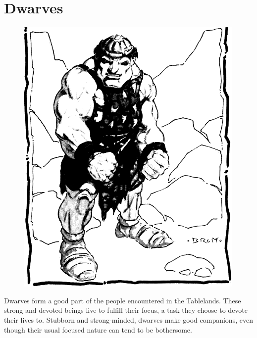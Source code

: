 \section{Dwarves}

\begin{figure}[h!]
\centering
\includegraphics[width=\columnwidth]{images/dwarf-1.png}
\end{figure}

Dwarves form a good part of the people encountered in the Tablelands. These strong and devoted beings live to fulfill their focus, a task they choose to devote their lives to. Stubborn and strong-minded, dwarves make good companions, even though their usual focused nature can tend to be bothersome.

